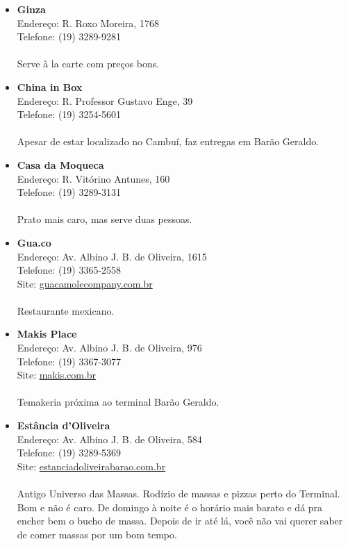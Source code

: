 \begin{itemize}
\item \textbf{Ginza}
  \\Endereço: R. Roxo Moreira, 1768
  \\Telefone: (19) 3289-9281
  \\
  \\Serve à la carte com preços bons.

\item \textbf{China in Box}
  \\Endereço: R. Professor Gustavo Enge, 39
  \\Telefone: (19) 3254-5601
  \\
  \\Apesar de estar localizado no Cambuí, faz entregas em Barão Geraldo.

\item \textbf{Casa da Moqueca}
  \\Endereço: R. Vitórino Antunes, 160
  \\Telefone: (19) 3289-3131
  \\
  \\Prato mais caro, mas serve duas pessoas.

\item \textbf{Gua.co}
  \\Endereço: Av. Albino J. B. de Oliveira, 1615
  \\Telefone: (19) 3365-2558
  \\Site: \url{guacamolecompany.com.br}
  \\
  \\Restaurante mexicano.

\item \textbf{Makis Place}
  \\Endereço: Av. Albino J. B. de Oliveira, 976
  \\Telefone: (19) 3367-3077
  \\Site: \url{makis.com.br}
  \\
  \\Temakeria próxima ao terminal Barão Geraldo.

\item \textbf{Estância d'Oliveira}
  \\Endereço: Av. Albino J. B. de Oliveira, 584
  \\Telefone: (19) 3289-5369
  \\Site: \url{estanciadoliveirabarao.com.br}
  \\
  \\Antigo Universo das Massas. Rodízio de massas e pizzas perto do Terminal. Bom e não
  é caro. De domingo à noite é o horário mais barato e dá pra encher bem o
  bucho de massa. Depois de ir até lá, você não vai querer saber de comer
  massas por um bom tempo.
\end{itemize}


